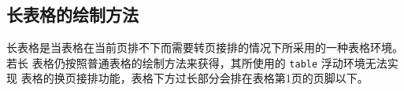 \subsection{长表格的绘制方法}

长表格是当表格在当前页排不下而需要转页接排的情况下所采用的一种表格环境。若长
表格仍按照普通表格的绘制方法来获得，其所使用的 \verb|table| 浮动环境无法实现
表格的换页接排功能，表格下方过长部分会排在表格第1页的页脚以下。

% 
% 
